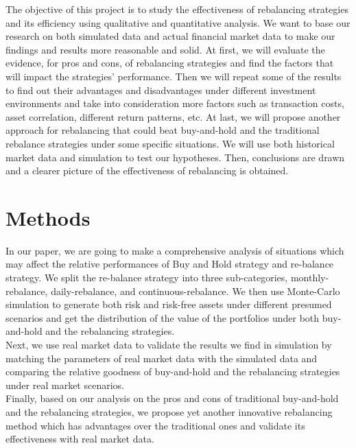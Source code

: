 \documentclass[
10pt, %
a4paper, %
oneside, %
headinclude,footinclude, %
BCOR5mm, %
]{scrartcl}
\begin{document}
The objective of this project is to study the effectiveness of rebalancing strategies and its efficiency using qualitative and quantitative analysis. We want to base our research on both simulated data and actual financial market data to make our findings and results more reasonable and solid. At first, we will evaluate the evidence, for pros and cons, of rebalancing strategies and find the factors that will impact the strategies’ performance. Then we will repeat some of the results to find out their advantages and disadvantages under different investment environments and take into consideration more factors such as transaction costs, asset correlation, different return patterns, etc. At last, we will propose another approach for rebalancing that could beat buy-and-hold and the traditional rebalance strategies under some specific situations. We will use both historical market data and simulation to test our hypotheses. Then, conclusions are drawn and a clearer picture of the effectiveness of rebalancing is obtained.

     
 

\section{Methods}
In our paper, we are going to make a comprehensive analysis of situations which may affect the relative performances of Buy and Hold strategy and re-balance strategy. We split the re-balance strategy into three sub-categories, monthly-rebalance, daily-rebalance, and continuous-rebalance. We then use Monte-Carlo simulation to generate both risk and risk-free assets under different presumed scenarios and get the distribution of the value of the portfolios under both buy-and-hold and the rebalancing strategies.\\

Next, we use real market data to validate the results we find in simulation by matching the parameters of real market data with the simulated data and comparing the relative goodness of buy-and-hold and the rebalancing strategies under real market scenarios.\\

Finally, based on our analysis on the pros and cons of traditional buy-and-hold and the rebalancing strategies, we propose yet another innovative rebalancing method which has advantages over the traditional ones and validate its effectiveness with real market data.\\
\end{document}
